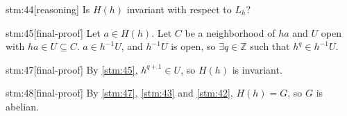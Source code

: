 \begin{stm}{stm:44}[reasoning]
Is $H(h)$ invariant with respect to $L_h$?
\end{stm}

\begin{stm}{stm:45}[final-proof]
Let $a \in H(h)$. Let $C$ be a neighborhood of $ha$ and $U$ open with $ha \in U \subseteq C$. $a \in h^{-1}U$, and $h^{-1}U$ is open, so $\exists q \in \mathbb{Z}$ such that $h^q \in h^{-1}U$.
\end{stm}

\begin{stm}{stm:47}[final-proof]
By \ref{stm:45}, $h^{q+1} \in U$, so $H(h)$ is invariant.
\end{stm}

\begin{stm}{stm:48}[final-proof]
By \ref{stm:47}, \ref{stm:43} and \ref{stm:42}, $H(h) = G$, so $G$ is abelian.
\end{stm}